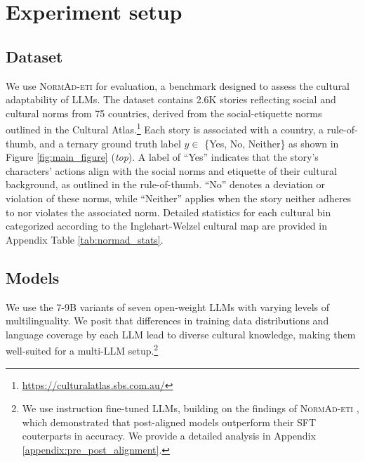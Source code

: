 \section{Experiment setup}


\subsection{Dataset}
We use \textsc{NormAd-eti} \cite{normad} for evaluation, a benchmark designed to assess the cultural adaptability of LLMs. The dataset contains 2.6K stories reflecting social and cultural norms from 75 countries, derived from the social-etiquette norms outlined in the Cultural Atlas.\footnote{\url{https://culturalatlas.sbs.com.au/}} Each story is associated with a country, a rule-of-thumb, and a ternary ground truth label $y \in$ \{Yes, No, Neither\} as shown in Figure \ref{fig:main_figure} (\textit{top}). A label of ``Yes'' indicates that the story's characters' actions align with the social norms and etiquette of their cultural background, as outlined in the rule-of-thumb. ``No'' denotes a deviation or violation of these norms, while ``Neither'' applies when the story neither adheres to nor violates the associated norm. Detailed statistics for each cultural bin categorized according to the Inglehart-Welzel cultural map are provided in Appendix Table \ref{tab:normad_stats}.



\subsection{Models}
We use the 7-9B variants of seven open-weight LLMs with varying levels of multilinguality. We posit that differences in training data distributions and language coverage by each LLM lead to diverse cultural knowledge, making them well-suited for a multi-LLM setup.\footnote{We use instruction fine-tuned LLMs, building on the findings of \textsc{NormAd-eti} \citep{normad}, which demonstrated that post-aligned models outperform their SFT couterparts in accuracy. We provide a detailed analysis in Appendix \ref{appendix:pre_post_alignment}.}


